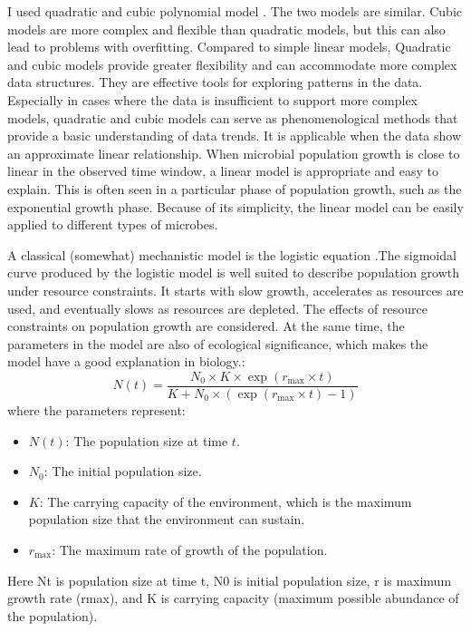 \documentclass[11pt]{article}
\begin{document}
I used quadratic and cubic polynomial model . The two models are similar. Cubic models are more complex and flexible than quadratic models, but this can also lead to problems with overfitting. Compared to simple linear models, Quadratic and cubic models provide greater flexibility and can accommodate more complex data structures\cite{penny2011}. 
They are effective tools for exploring patterns in the data. Especially in cases where the data is insufficient to support more complex models, quadratic and cubic models can serve as phenomenological methods that provide a basic understanding of data trends. It is applicable when the data show an approximate linear relationship\cite{penny2011}. When microbial population growth is close to linear in the observed time window, a linear model is appropriate and easy to explain. This is often seen in a particular phase of population growth, such as the exponential growth phase. Because of its simplicity, the linear model can be easily applied to different types of microbes.

A classical (somewhat) mechanistic model is the logistic equation\cite{zwietering1990} .The sigmoidal curve produced by the logistic model is well suited to describe population growth under resource constraints. It starts with slow growth, accelerates as resources are used, and eventually slows as resources are depleted. The effects of resource constraints on population growth are considered. At the same time, the parameters in the model are also of ecological significance, which makes the model have a good explanation in biology.:
\begin{equation}
    N(t) = \frac{N_0 \times K \times \exp(r_{\text{max}} \times t)}{K + N_0 \times (\exp(r_{\text{max}} \times t) - 1)}
\end{equation}
where the parameters represent:
\begin{itemize}
    \item $N(t)$: The population size at time $t$.
    \item $N_0$: The initial population size.
    \item $K$: The carrying capacity of the environment, which is the maximum population size that the environment can sustain.
    \item $r_{\text{max}}$: The maximum rate of growth of the population.
\end{itemize}
Here Nt is population size at time t, N0 is initial population size, r is maximum growth rate (rmax), and K is carrying capacity (maximum possible abundance of the population).
\end{document}
